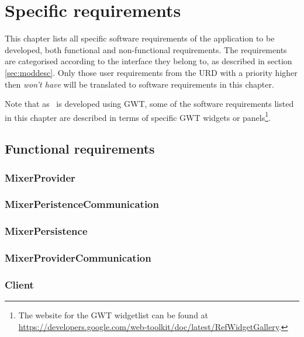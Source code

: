 \chapter{Specific requirements}
\label{chap:specreq}
This chapter lists all specific software requirements of the application to be developed, both functional and non-functional requirements. The requirements are categorised according to the interface they belong to, as described in section \ref{sec:moddesc}. Only those user requirements from the URD \cite{urd} with a priority higher then \emph{won't have} will be translated to software requirements in this chapter.

Note that as \applicationname\ is developed using GWT, some of the software requirements listed in this chapter are described in terms of specific GWT widgets or panels\footnote{The website for the GWT widgetlist can be found at \url{https://developers.google.com/web-toolkit/doc/latest/RefWidgetGallery}.}.


\section{Functional requirements}
\label{sec:funcreq}

\subsection{MixerProvider}

\subsection{MixerPeristenceCommunication}

\subsection{MixerPersistence}

\subsection{MixerProviderCommunication}

\subsection{Client}

